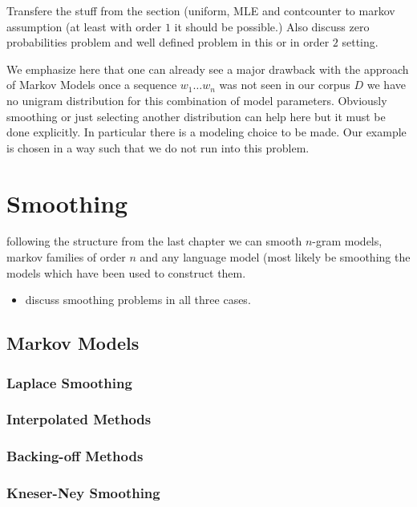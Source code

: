 \documentclass[•]{book}
\begin{document}
\begin{example}
Transfere the stuff from the section (uniform, MLE and contcounter to markov assumption (at least with order $1$ it should be possible.) Also discuss zero probabilities problem and well defined problem in this or in order $2$ setting. 
\end{example}

We emphasize here that one can already see a major drawback with the approach of Markov Models once a sequence $w_1\dots w_n$ was not seen in our corpus $D$ we have no unigram distribution for this combination of model parameters. 
Obviously smoothing or just selecting another distribution can help here but it must be done explicitly.
In particular there is a modeling choice to be made. 
Our example is chosen in a way such that we do not run into this problem. 

\chapter{Smoothing}
following the structure from the last chapter we can smooth $n$-gram models, markov families of order $n$ and any language model (most likely be smoothing the models which have been used to construct them. 

\begin{itemize}
\item discuss smoothing problems in all three cases.
\end{itemize}
\section{Markov Models}
\subsection{Laplace Smoothing}
\subsection{Interpolated Methods}
\subsection{Backing-off Methods}
\subsection{Kneser-Ney Smoothing}
\end{document}
